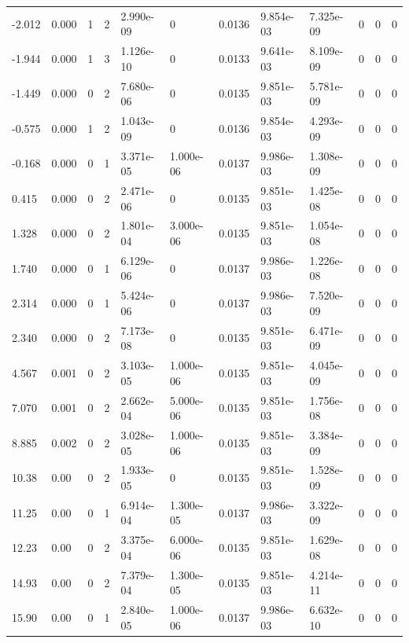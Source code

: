 \documentclass[preview]{standalone}
\begin{document}
{{\begin{tabular}{L{1.2cm}C{1.2cm} C{0.3cm}C{0.5cm} C{1.4cm}C{1.4cm} C{1.4cm}C{1.4cm} C{1.6cm}C{1.6cm} C{1.6cm}C{1.6cm}}
  -2.012  &  0.000  & 1     &  2 &  2.990e-09  & 0  &  0.0136&   9.854e-03& 7.325e-09 & 0   &  0 & 0  \\ 
  -1.944  &  0.000  & 1     &  3 &  1.126e-10  & 0  &  0.0133&   9.641e-03& 8.109e-09 & 0   &  0 & 0  \\ 
  -1.449  &  0.000  & 0     &  2 &  7.680e-06  & 0  &  0.0135&   9.851e-03& 5.781e-09 & 0   &  0 & 0  \\ 
  -0.575  &  0.000  & 1     &  2 &  1.043e-09  & 0  &  0.0136&   9.854e-03& 4.293e-09 & 0   &  0 & 0  \\ 
  -0.168  &  0.000  & 0     &  1 &  3.371e-05  & 1.000e-06  &  0.0137&   9.986e-03& 1.308e-09 & 0   &  0 & 0  \\ 
  0.415  &  0.000  & 0     &  2 &  2.471e-06  & 0  &  0.0135&   9.851e-03& 1.425e-08 & 0   &  0 & 0  \\ 
  1.328  &  0.000  & 0     &  2 &  1.801e-04  & 3.000e-06  &  0.0135&   9.851e-03& 1.054e-08 & 0   &  0 & 0  \\ 
  1.740  &  0.000  & 0     &  1 &  6.129e-06  & 0  &  0.0137&   9.986e-03& 1.226e-08 & 0   &  0 & 0  \\ 
  2.314  &  0.000  & 0     &  1 &  5.424e-06  & 0  &  0.0137&   9.986e-03& 7.520e-09 & 0   &  0 & 0  \\ 
  2.340  &  0.000  & 0     &  2 &  7.173e-08  & 0  &  0.0135&   9.851e-03& 6.471e-09 & 0   &  0 & 0  \\ 
  4.567  &  0.001  & 0     &  2 &  3.103e-05  & 1.000e-06  &  0.0135&   9.851e-03& 4.045e-09 & 0   &  0 & 0  \\ 
  7.070  &  0.001  & 0     &  2 &  2.662e-04  & 5.000e-06  &  0.0135&   9.851e-03& 1.756e-08 & 0   &  0 & 0  \\ 
  8.885  &  0.002  & 0     &  2 &  3.028e-05  & 1.000e-06  &  0.0135&   9.851e-03& 3.384e-09 & 0   &  0 & 0  \\ 
  10.38  &  0.00  & 0     &  2 &  1.933e-05  & 0  &  0.0135&   9.851e-03& 1.528e-09 & 0   &  0 & 0  \\ 
  11.25  &  0.00  & 0     &  1 &  6.914e-04  & 1.300e-05  &  0.0137&   9.986e-03& 3.322e-09 & 0   &  0 & 0  \\ 
  12.23  &  0.00  & 0     &  2 &  3.375e-04  & 6.000e-06  &  0.0135&   9.851e-03& 1.629e-08 & 0   &  0 & 0  \\ 
  14.93  &  0.00  & 0     &  2 &  7.379e-04  & 1.300e-05  &  0.0135&   9.851e-03& 4.214e-11 & 0   &  0 & 0  \\ 
  15.90  &  0.00  & 0     &  1 &  2.840e-05  & 1.000e-06  &  0.0137&   9.986e-03& 6.632e-10 & 0   &  0 & 0  \\ 

\end{tabular}}}
\end{document}
